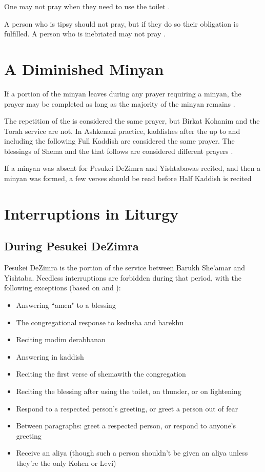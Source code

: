 One may not pray when they need to use the toilet \parencite*[5:8 citing Berakhot 15a]{PH}.

A person who is tipsy should not pray, but if they do so their obligation is fulfilled.  A person who is inebriated may not pray \parencite*[5:11 citing OC 99]{PH}.

\section{A Diminished Minyan}

If a portion of the minyan leaves during any prayer requiring a minyan, the prayer may be completed as long as the majority of the minyan remains  \parencite*[2:10 citing OC 55]{PH}.

The repetition of the \amidah is considered the same prayer, but Birkat Kohanim and the Torah service are not. In Ashkenazi practice, kaddishes after the \amidah up to and including the following Full Kaddish are considered the same prayer. The blessings of Shema and the \amidah that follows are considered different prayers \parencite*{PH}.

If a minyan was absent for Pesukei DeZimra and Yishtaba\heth\space was recited, and then a minyan was formed, a few verses should be read before Half Kaddish is recited \parencite*[15:1]{Kitzur}

\section{Interruptions in Liturgy}

\subsection{During Pesukei DeZimra}

Pesukei DeZimra is the portion of the service between Barukh She'amar and Yishtaba\heth . Needless interruptions are forbidden during that period, with the following exceptions (based on \cite*[``Table of Permitted Responses"]{Koren} and \cite*[16:5]{PH}):
\begin{itemize}
	\item Answering ``amen" to a blessing 
	\item The congregational response to kedusha and barekhu
	\item Reciting modim derabbanan
	\item Answering  in kaddish
	\item Reciting the first verse of shema\space with the congregation
	\item Reciting the blessing after using the toilet, on thunder, or on lightening
	\item Respond to a respected person's greeting, or greet a person out of fear
	\item Between paragraphs: greet a respected person, or respond to anyone's greeting
	\item Receive an aliya (though such a person shouldn't be given an aliya unless they're the only Kohen or Levi)
\end{itemize}


